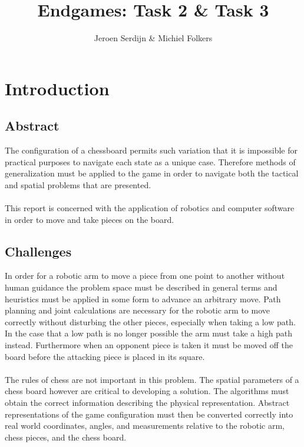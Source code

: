 \documentclass[11pt,a4paper]{article}
\title{Endgames: Task 2 \& Task 3}
\author{Jeroen Serdijn \& Michiel Folkers}
\begin{document}
\maketitle

\section{Introduction}


\subsection{Abstract}
The configuration of a chessboard permits such variation that it is impossible for practical purposes to navigate each state as a unique case. Therefore methods of generalization must be applied to the game in order to navigate both the tactical and spatial problems that are presented.\\
\\
\noindent
This report is concerned with the application of robotics and computer software in order to move and take pieces on the board.

\subsection{Challenges}
In order for a robotic arm to move a piece from one point to another without human guidance the problem space must be described in general terms and heuristics must be applied in some form to advance an arbitrary move. Path planning and joint calculations are necessary for the robotic arm to move correctly without disturbing the other pieces, especially when taking a low path. In the case that a low path is no longer possible the arm must take a high path instead. Furthermore when an opponent piece is taken it must be moved off the board before the attacking piece is placed in its square.\\
\\
\noindent
The rules of chess are not important in this problem. The spatial parameters of a chess board however are critical to developing a solution. The algorithms must obtain the correct information describing the physical representation. Abstract representations of the game configuration must then be converted correctly into real world coordinates, angles, and measurements relative to the robotic arm, chess pieces, and the chess board.
\end{document}

